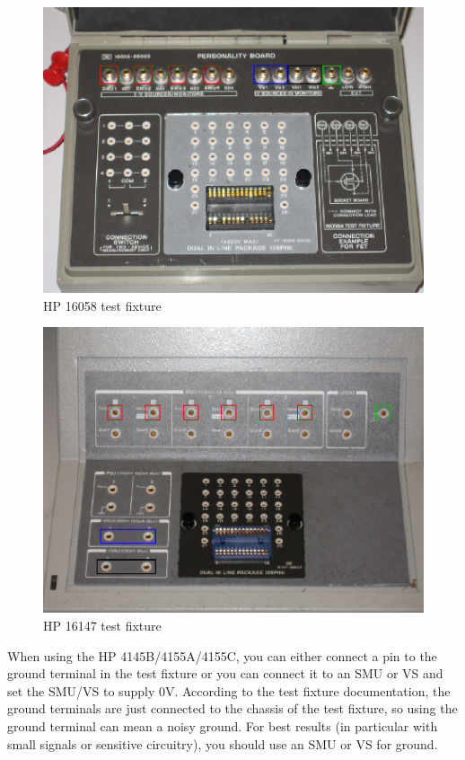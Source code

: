 \documentclass{article}
\begin{document}
\begin{figure}[!htb]
  \centering
  \includegraphics{testold.eps}
  \caption{HP 16058 test fixture}
  \label{testold}
\end{figure}

\begin{figure}[!htb]
  \centering
  \includegraphics{testnew.eps}
  \caption{HP 16147 test fixture}
  \label{testnew}
\end{figure}

When using the HP 4145B/4155A/4155C, you can either connect a pin to the ground terminal in the test fixture or you can connect it to an SMU or VS and set the SMU/VS to supply 0V. According to the test fixture documentation, the ground terminals are just connected to the chassis of the test fixture, so using the ground terminal can mean a noisy ground. For best results (in particular with small signals or sensitive circuitry), you should use an SMU or VS for ground.
\end{document}
